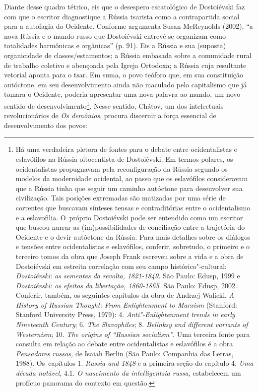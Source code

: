 Diante desse quadro tétrico, eis que o desespero escatológico de
Dostoiévski faz com que o escritor diagnostique a Rússia tsarista como a
contrapartida social para a autofagia do Ocidente. Conforme argumenta
Susan McReynolds (2002), ``a nova Rússia e o mundo russo que Dostoiévski
entrevê se organizam como totalidades harmônicas e orgânicas'' (p. 91).
Eis a Rússia e sua (suposta) organicidade de classes/estamentos; a
Rússia embasada sobre a comunidade rural de trabalho coletivo e
abençoada pela Igreja Ortodoxa; a Rússia cuja resultante vetorial aponta
para o tsar. Em suma, o povo teóforo que, em sua constituição autóctone,
em seu desenvolvimento ainda não maculado pelo capitalismo que já tomara
o Ocidente, poderia apresentar uma nova palavra ao mundo, um novo
sentido de desenvolvimento\footnote{Há uma verdadeira pletora de fontes
  para o debate entre ocidentalistas e eslavófilos na Rússia
  oitocentista de Dostoiévski. Em termos polares, os ocidentalistas
  propugnavam pela reconfiguração da Rússia segundo os modelos da
  modernidade ocidental, ao passo que os eslavófilos consideravam que a
  Rússia tinha que seguir um caminho autóctone para desenvolver sua
  civilização. Tais posições extremadas são matizadas por uma série de
  correntes que buscavam sínteses tensas e contraditórias entre o
  ocidentalismo e a eslavofilia. O~próprio Dostoiévski pode ser
  entendido como um escritor que buscou narrar as (im)possibilidades de
  conciliação entre a trajetória do Ocidente e o devir autóctone da
  Rússia. Para mais detalhes sobre os diálogos e tensões entre
  ocidentalistas e eslavófilos, conferir, sobretudo, o primeiro e o
  terceiro tomos da obra que Joseph Frank escreveu sobre a vida e a obra
  de Dostoiévski em estreita correlação com seu campo
  histórico"-cultural: \emph{Dostoiévski: as sementes da revolta,
  1821-1849.} São Paulo: Edusp, 1999 e \emph{Dostoiévski: os efeitos da
  libertação, 1860-1865}. São Paulo: Edusp, 2002. Conferir, também, os
  seguintes capítulos da obra de Andrzej Walicki, \emph{A History of
  Russian Thought: From Enlightenment to Marxism} (Stanford: Stanford
  University Press, 1979): 4. \emph{Anti"-Enlightenment trends in early
  Nineteenth Century}; 6. \emph{The Slavophiles}; 8. \emph{Belinksy and
  different variants of Westernism}; 10. \emph{The origins of ``Russian
  socialism''}. Uma terceira fonte para consulta em relação ao debate
  entre ocidentalistas e eslavófilos é a obra \emph{Pensadores russos,}
  de Isaiah Berlin (São Paulo: Companhia das Letras, 1988). Os~capítulos
  1. \emph{Russia and 1848} e a primeira seção do capítulo 4. \emph{Uma
  década notável}, 4.1. \emph{O nascimento da intelligentsia russa,}
  estabelecem um profícuo panorama do contexto em questão.}. Nesse
sentido, Chátov, um dos intelectuais revolucionários de \emph{Os
demônios}, procura discernir a força essencial de desenvolvimento dos
povos:

